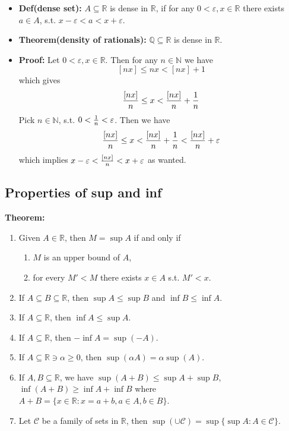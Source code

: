 \documentclass{article}
\begin{document}
\begin{itemize}
\item \textbf{Def(dense set):} $A\subseteq \mathbb{R}$ is dense in $\mathbb{R}$, if for any $0<\varepsilon, x\in \mathbb{R}$ there exists $a\in A$, s.t. $x-\varepsilon<a<x+\varepsilon$.

\item \textbf{Theorem(density of rationals):} $\mathbb{Q\subseteq\mathbb{R}}$ is dense in $\mathbb{R}$.

\item \textbf{Proof:} Let $0<\varepsilon, x\in \mathbb{R}$. Then for any $n\in \mathbb{N}$ we have 
\[
[nx]\leq nx<[nx] + 1
\]
which gives
\[
{[nx]\over n}\leq x <{[nx]\over n} + {1\over n}
\]
Pick $n\in \mathbb{N}$, s.t. $0<{1\over n}<\varepsilon$. Then we have
\[
{[nx]\over n}\leq x <{[nx]\over n} +{1\over n}<{[nx]\over n} +\varepsilon
\]
which implies $x-\varepsilon<{[nx]\over n} <x+\varepsilon$ as wanted.
\end{itemize}

\subsection{Properties of sup and inf}

\textbf{Theorem:} 
\begin{enumerate}
    \item Given $A\in \mathbb{R}$, then $M=\sup A$ if and only if
    \begin{enumerate}
        \item $M$ is an upper bound of $A$, 
        \item for every $M' < M$ there exists $x\in A$ s.t. $M'<x$.
    \end{enumerate}
    \item If $A\subseteq B\subseteq \mathbb{R}$, then $\sup A\leq \sup B$ and $\inf B\leq \inf A$.
    \item If $A\subseteq \mathbb{R}$, then $\inf A\leq \sup A$.
    \item If $A\subseteq \mathbb{R}$, then $-\inf A = \sup (-A)$.
    \item If $A\subseteq \mathbb{R} \ni \alpha\geq 0$, then $\sup (\alpha A)=\alpha\sup (A)$.
    \item If $A, B \subseteq \mathbb{R}$, we have $\sup (A+B)\leq \sup A + \sup B$, $\inf (A+B)\geq \inf A+\inf B$ where $A+B=\{x\in \mathbb{R}:x=a+b, a\in A, b\in B\}$.
    \item Let $\mathcal{C}$ be a family of sets in $\mathbb{R}$, then $\sup (\cup \mathcal{C}) = \sup \{\sup A:A\in \mathcal{C}\}$.
\end{enumerate}
\end{document}
